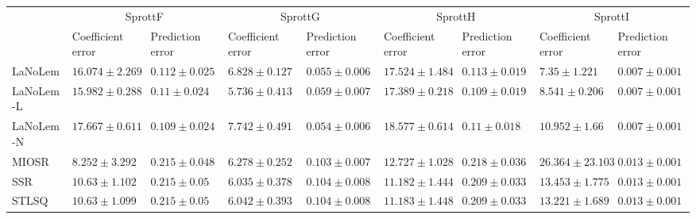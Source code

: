 \begin{table*}
{\begin{tabular}{lllllllll}
 & \multicolumn{2}{c}{SprottF} & \multicolumn{2}{c}{SprottG} & \multicolumn{2}{c}{SprottH} & \multicolumn{2}{c}{SprottI} \\
 & Coefficient error & Prediction error & Coefficient error & Prediction error & Coefficient error & Prediction error & Coefficient error & Prediction error \\
\midrule
LaNoLem & $16.074\pm 2.269$ & $0.112\pm 0.025$ & $6.828\pm 0.127$ & $0.055\pm 0.006$ & $17.524\pm 1.484$ & $0.113\pm 0.019$ & $\mathbf{7.35}\pm 1.221$ & $0.007\pm 0.001$ \\
LaNoLem-L & $15.982\pm 0.288$ & $0.11\pm 0.024$ & $\mathbf{5.736}\pm 0.413$ & $0.059\pm 0.007$ & $17.389\pm 0.218$ & $\mathbf{0.109}\pm 0.019$ & $8.541\pm 0.206$ & $\mathbf{0.007}\pm 0.001$ \\
LaNoLem-N & $17.667\pm 0.611$ & $\mathbf{0.109}\pm 0.024$ & $7.742\pm 0.491$ & $\mathbf{0.054}\pm 0.006$ & $18.577\pm 0.614$ & $0.11\pm 0.018$ & $10.952\pm 1.66$ & $0.007\pm 0.001$ \\
MIOSR & $\mathbf{8.252}\pm 3.292$ & $0.215\pm 0.048$ & $6.278\pm 0.252$ & $0.103\pm 0.007$ & $12.727\pm 1.028$ & $0.218\pm 0.036$ & $26.364\pm 23.103$ & $0.013\pm 0.001$ \\
SSR & $10.63\pm 1.102$ & $0.215\pm 0.05$ & $6.035\pm 0.378$ & $0.104\pm 0.008$ & $\mathbf{11.182}\pm 1.444$ & $0.209\pm 0.033$ & $13.453\pm 1.775$ & $0.013\pm 0.001$ \\
STLSQ & $10.63\pm 1.099$ & $0.215\pm 0.05$ & $6.042\pm 0.393$ & $0.104\pm 0.008$ & $11.183\pm 1.448$ & $0.209\pm 0.033$ & $13.221\pm 1.689$ & $0.013\pm 0.001$ \\

\midrule


\end{tabular}}
\end{table*}
